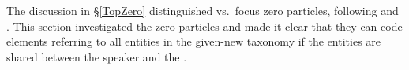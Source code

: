 The discussion in \S \ref{TopZero} distinguished  vs.~focus zero particles,
following  and .
This section investigated the  zero particles and made it clear
that they can code elements referring to all entities in the given-new taxonomy
if the entities are shared between the speaker and the .


%
%
%

